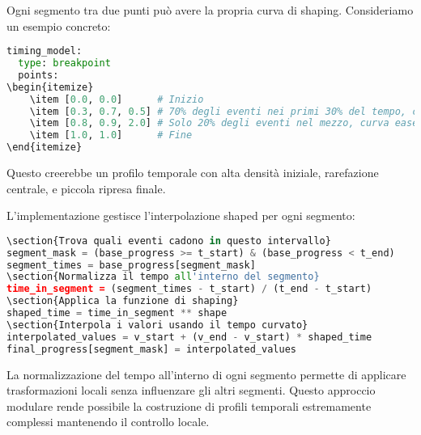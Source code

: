 Ogni segmento tra due punti può avere la propria curva di shaping. Consideriamo un esempio concreto:

\begin{lstlisting}[language=Python]
timing_model:
  type: breakpoint
  points:
\begin{itemize}
    \item [0.0, 0.0]      # Inizio
    \item [0.3, 0.7, 0.5] # 70% degli eventi nei primi 30% del tempo, curva ease-out
    \item [0.8, 0.9, 2.0] # Solo 20% degli eventi nel mezzo, curva ease-in
    \item [1.0, 1.0]      # Fine
\end{itemize}
\end{lstlisting}

Questo creerebbe un profilo temporale con alta densità iniziale, rarefazione centrale, e piccola ripresa finale.

L'implementazione gestisce l'interpolazione shaped per ogni segmento:

\begin{lstlisting}[language=Python]
\section{Trova quali eventi cadono in questo intervallo}
segment_mask = (base_progress >= t_start) & (base_progress < t_end)
segment_times = base_progress[segment_mask]
\section{Normalizza il tempo all'interno del segmento}
time_in_segment = (segment_times - t_start) / (t_end - t_start)
\section{Applica la funzione di shaping}
shaped_time = time_in_segment ** shape
\section{Interpola i valori usando il tempo curvato}
interpolated_values = v_start + (v_end - v_start) * shaped_time
final_progress[segment_mask] = interpolated_values
\end{lstlisting}

La normalizzazione del tempo all'interno di ogni segmento permette di applicare trasformazioni locali senza influenzare gli altri segmenti. Questo approccio modulare rende possibile la costruzione di profili temporali estremamente complessi mantenendo il controllo locale.
